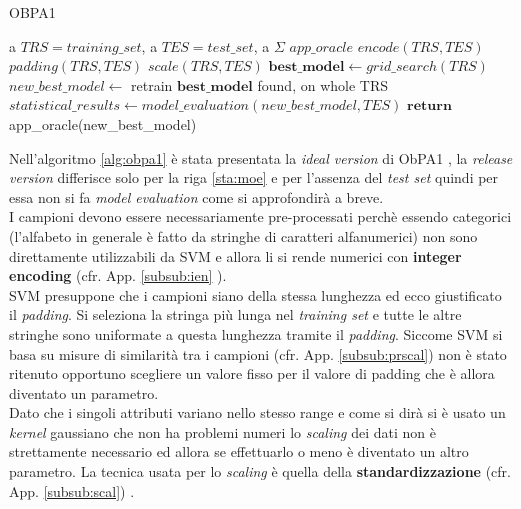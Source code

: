 \begin{algorithm}
\caption{OBPA1}\label{alg:obpa1}
\begin{algorithmic}[1]
\Statex
\Input a $TRS = training\_set$, a $TES = test\_set$, a $\Sigma$   
\Output $app\_oracle$
\State $encode(TRS , TES)$
\State $padding(TRS , TES)$
\State $scale(TRS , TES)$
\State $\textbf{best\_model} \gets grid\_search(TRS)$ \label{sta:quattro}
\State $new\_best\_model \gets$ retrain $\textbf{best\_model}$ found, on whole TRS
\State $statistical\_results \gets model\_evaluation(new\_best\_model,TES)$ \label{sta:moe}
\State $\textbf{return}$ app\_oracle(new\_best\_model) 

   
\end{algorithmic}
\end{algorithm}
Nell'algoritmo \ref{alg:obpa1} è stata presentata la \textit{ideal version} di \ac{ObPA}1 , la \textit{release version} differisce solo per la riga \ref{sta:moe} e per l'assenza del \textit{test set} quindi per essa non si fa \textit{model evaluation} come si approfondirà a breve.\\
I campioni devono essere necessariamente pre-processati perchè essendo categorici (l'alfabeto in generale è fatto da stringhe di caratteri alfanumerici) non sono direttamente utilizzabili da \ac{SVM} e allora li si rende numerici con \textbf{integer encoding} (cfr. App. \ref{subsub:ien} ).\\
\ac{SVM} presuppone che i campioni siano della stessa lunghezza ed ecco giustificato il \textit{padding}. Si seleziona la stringa più lunga nel \textit{training set} e tutte le altre stringhe sono uniformate a questa lunghezza tramite il \textit{padding}. Siccome \ac{SVM} si basa su misure di similarità tra i campioni (cfr. App. \ref{subsub:prscal}) non è stato ritenuto opportuno scegliere un valore fisso per il valore di padding che è allora diventato un parametro.\\
Dato che i singoli attributi variano nello stesso range e come si dirà si è usato un \textit{kernel} gaussiano che non ha problemi numeri lo \textit{scaling} dei dati non è strettamente necessario ed allora se effettuarlo o meno è diventato un altro parametro. La tecnica usata per lo \textit{scaling} è quella della \textbf{standardizzazione} (cfr. App. \ref{subsub:scal}) . 

